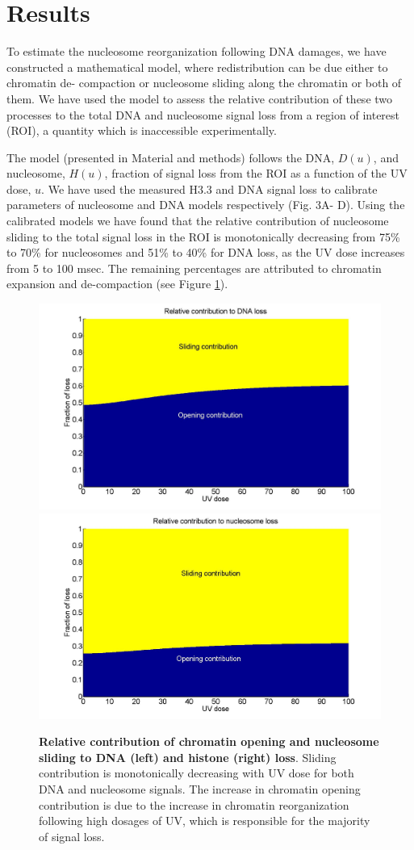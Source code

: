 \documentclass[12pt]{article}
\begin{document}
	 
	 
	 
	\section{Results}\label{section:Results}
	To estimate the nucleosome reorganization following DNA damages, we have
	constructed a mathematical model, where redistribution can be due either to chromatin de-
	compaction or nucleosome sliding along the chromatin or both of them. We
	have used the model to assess the relative contribution of these two processes
	to the total DNA and nucleosome signal loss from a region of interest (ROI),
	a quantity which is inaccessible experimentally.
	
	The model (presented in Material and methods) follows the DNA, $D(u)$,
	and nucleosome, $H(u)$, fraction of signal loss from the ROI as a function of
	the UV dose, $u$. We have used the measured H3.3 and DNA signal loss to
	calibrate parameters of nucleosome and DNA models respectively (Fig. 3A-
	D). Using the calibrated models we have found that the relative contribution
	of nucleosome sliding to the total signal loss in the ROI is monotonically
	decreasing from 75\% to 70\% for nucleosomes and 51\% to 40\% for DNA loss,
	as the UV dose increases from 5 to 100 msec. The remaining percentages are
	attributed to chromatin expansion and de-compaction (see Figure \ref{fig:relatiiveContributionToLoss}).
	
	\begin{figure}[H]
		\includegraphics[width=0.5\linewidth, height=0.3\textheight]{relatiiveContributionToDNALoss}
		\includegraphics[width=0.5\linewidth, height=0.3\textheight]{relativeContributionToHistoneLoss}
		\caption{\textbf{Relative contribution of chromatin opening and nucleosome sliding to DNA (left) and histone (right) loss}. Sliding contribution is monotonically decreasing with UV dose for both DNA and nucleosome signals. The increase in chromatin opening contribution is due to the increase in chromatin reorganization following high dosages of UV, which is responsible for the majority of signal loss.}
		\label{fig:relatiiveContributionToLoss}
	\end{figure}
	
\end{document}
